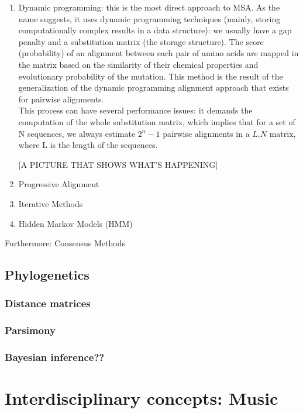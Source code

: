 \documentclass[11pt,twoside,a4paper]{report}
\begin{document}
\begin{enumerate}
\item Dynamic programming: this is the most direct approach to MSA. As the name suggests, it uses dynamic programming techniques (mainly, storing computationally complex results in a data structure): we usually have a gap penalty and a substitution matrix (the storage structure). The score (probability) of an alignment between each pair of amino acids are mapped in the matrix based on the similarity of their chemical properties and evolutionary probability of the mutation. This method is the result of the generalization of the dynamic programming alignment approach that exists for pairwise alignments.\\
This process can have several performance issues: it demands the computation of the whole substitution matrix, which implies that for a set of N sequences, we always estimate $2^{n}-1$ pairwise alignments in a $L.N$ matrix, where L is the length of the sequences. 


[A PICTURE THAT SHOWS WHAT'S HAPPENING]
\item Progressive Alignment
\item Iterative Methods
\item Hidden Markov Models (HMM)
\end{enumerate}

\begin{description}
\item Furthermore: Consensus Methods
\end{description}

\subsection{Phylogenetics}
\subsubsection{Distance matrices}
\subsubsection{Parsimony}
\subsubsection{Bayesian inference??}

\section{Interdisciplinary concepts: Music}
\end{document}

